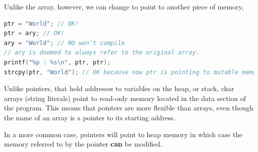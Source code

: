 Unlike the array, however, we can change  to point to another piece of memory,

\begin{lstlisting}[language=C]
ptr = "World"; // OK!
ptr = ary; // OK!
ary = "World"; // NO won't compile
// ary is doomed to always refer to the original array.
printf("%p : %s\n", ptr, ptr);
strcpy(ptr, "World"); // OK because now ptr is pointing to mutable memory (the array)
\end{lstlisting}

Unlike pointers, that hold addresses to variables on the heap, or stack, char arrays (string literals) point to read-only memory located in the data section of the program. This means that pointers are more flexible than arrays, even though the name of an array is a pointer to its starting address.

In a more common case, pointers will point to heap memory in which case the memory referred to by the pointer \textbf{can} be modified.



